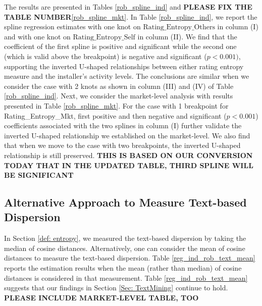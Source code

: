 \documentclass[msom,blindrev]{informs3}
\begin{document}
The results are presented in Tables \ref{rob_spline_ind} and \textbf{PLEASE FIX THE TABLE NUMBER}\ref{rob_spline_mkt}. In Table \ref{rob_spline_ind}, we report the spline regression estimates with one knot on $\text{Rating\_Entropy\_Others}$ in column (I) and with one knot on $\text{Rating\_Entropy\_Self}$ in column (II). We find that the coefficient of the first spline is positive and significant while the second one (which is valid above the breakpoint) is negative and significant ($p<0.001)$, supporting the inverted U-shaped relationships between either rating entropy measure and the installer's activity levels. The conclusions are similar when we consider the case with 2 knots as shown in column (III) and (IV) of Table \ref{rob_spline_ind}.  Next, we consider the market-level analysis with results presented in Table \ref{rob_spline_mkt}. For the case with 1 breakpoint for Rating\_Entropy\_Mkt, first positive and then negative and significant ($p<0.001$) coefficients associated with the two splines in column (I) further validate the inverted U-shaped relationship we established on the market-level. We also find that when we move to the case with two breakpoints, the inverted U-shaped relationship is still preserved. \textbf{THIS IS BASED ON OUR CONVERSION TODAY THAT IN THE UPDATED TABLE, THIRD SPLINE WILL BE SIGNIFICANT}


%
%

\subsection{Alternative Approach to Measure Text-based Dispersion}

In Section \ref{def: entropy}, we measured the text-based dispersion by taking the median of cosine distances. Alternatively, one can consider the mean of cosine distances to measure the text-based dispersion. Table \ref{reg_ind_rob_text_mean} reports the estimation results when the mean (rather than median) of cosine distances is considered in that measurement. Table \ref{reg_ind_rob_text_mean} suggests that our findings in Section \ref{Sec: TextMining} continue to hold. \textbf{PLEASE INCLUDE MARKET-LEVEL TABLE, TOO}
\end{document}
